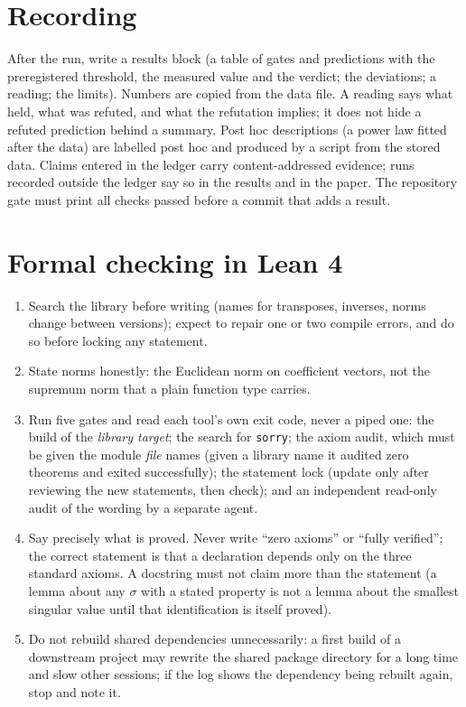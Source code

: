 \documentclass[11pt,a4paper]{article}
\begin{document}
\section{Recording}
After the run, write a results block (a table of gates and predictions with the preregistered threshold, the measured value and the verdict; the deviations; a reading; the limits). Numbers are copied from the data file. A reading says what held, what was refuted, and what the refutation implies; it does not hide a refuted prediction behind a summary.
Post hoc descriptions (a power law fitted after the data) are labelled post hoc and produced by a script from the stored data. Claims entered in the ledger carry content-addressed evidence; runs recorded outside the ledger say so in the results and in the paper.
The repository gate must print all checks passed before a commit that adds a result.

\section{Formal checking in Lean 4}
\begin{enumerate}
\item Search the library before writing (names for transposes, inverses, norms change between versions); expect to repair one or two compile errors, and do so before locking any statement.
\item State norms honestly: the Euclidean norm on coefficient vectors, not the supremum norm that a plain function type carries.
\item Run five gates and read each tool's own exit code, never a piped one: the build of the \emph{library target}; the search for \texttt{sorry}; the axiom audit, which must be given the module \emph{file} names (given a library name it audited zero theorems and exited successfully); the statement lock (update only after reviewing the new statements, then check); and an independent read-only audit of the wording by a separate agent.
\item Say precisely what is proved. Never write ``zero axioms'' or ``fully verified''; the correct statement is that a declaration depends only on the three standard axioms. A docstring must not claim more than the statement (a lemma about any $\sigma$ with a stated property is not a lemma about the smallest singular value until that identification is itself proved).
\item Do not rebuild shared dependencies unnecessarily: a first build of a downstream project may rewrite the shared package directory for a long time and slow other sessions; if the log shows the dependency being rebuilt again, stop and note it.
\end{enumerate}
\end{document}
